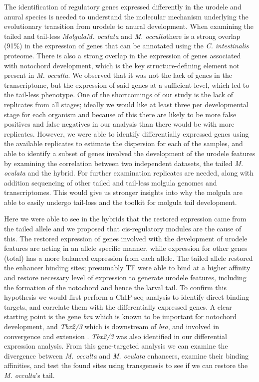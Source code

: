 The identification of regulatory genes expressed differently in the urodele and anural species is needed to understand the molecular mechanism underlying the evolutionary transition from urodele to anural development. When examining the tailed and tail-less \textit{Molgula}\textemdash \textit{M. oculata} and \textit{M. occulta}\textemdash there is a strong overlap (91\%) in the expression of genes that can be annotated using the \textit{C. intestinalis} proteome. There is also a strong overlap in the expression of genes associated with notochord development, which is the key structure-defining element not present in \textit{M. occulta}. We observed that it was not the lack of genes in the transcriptome, but the expression of said genes at a sufficient level, which led to the tail-less phenotype. One of the shortcomings of our study is the lack of replicates from all stages; ideally we would like at least three per developmental stage for each organism and because of this there are likely to be more false positives and false negatives in our analysis than there would be with more replicates. However, we were able to identify differentially expressed genes using the available replicates to estimate the dispersion for each of the samples, and able to identify a subset of genes involved the development of the urodele features by examining the correlation between two independent datasets, the tailed \textit{M. oculata} and the hybrid. For further examination replicates are needed, along with addition sequencing of other tailed and tail-less molgula genomes and transcriptomes. This would give us stronger insights into why the molgula are able to easily undergo tail-loss and the toolkit for molgula tail development. 

Here we were able to see in the hybrids that the restored expression came from the tailed allele and we proposed that cis-regulatory modules are the cause of this. The restored expression of genes involved with the development of urodele features are acting in an allele specific manner, while expression for other genes (total) has a more balanced expression from each allele. The tailed allele restored the enhancer binding sites; presumably TF were able to bind at a higher affinity and restore necessary level of expression to generate urodele features, including the formation of the notochord and hence the larval tail. To confirm this hypothesis we would first perform a ChIP-seq analysis to identify direct binding targets, and correlate them with the differentially expressed genes. A clear starting point is the gene \textit{bra} which is known to be important for notochord development, and \textit{Tbx2/3} which is downstream of \textit{bra}, and involved in convergence and extension \cite{katikala_functional_2013}.  {\em Tbx2/3} was also identified in our differential expression analysis. From this gene-targeted analysis we can examine the divergence between \textit{M. occulta} and \textit{M. oculata} enhancers, examine their binding affinities, and test the found sites using transgenesis to see if we can restore the \textit{M. occulta}'s tail.

